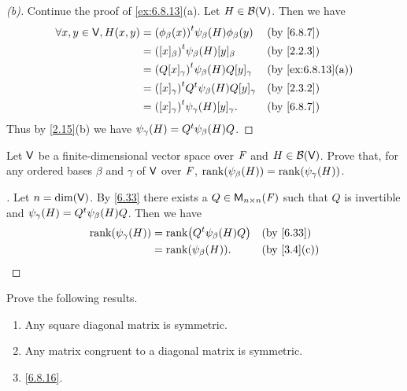\begin{proof}[(b)]
  Continue the proof of \cref{ex:6.8.13}(a).
  Let \(H \in \mathcal{B}(\mathsf{V})\).
  Then we have
  \begin{align*}
    \forall x, y \in \V, H(x, y) & = \tp{(\phi_{\beta}(x))} \psi_{\beta}(H) \phi_{\beta}(y)    &  & \by{6.8.7}        \\
                                 & = \tp{([x]_{\beta})} \psi_{\beta}(H) [y]_{\beta}            &  & \by{2.2.3}        \\
                                 & = \tp{(Q [x]_{\gamma})} \psi_{\beta}(H) Q [y]_{\gamma}      &  & \by{ex:6.8.13}[a] \\
                                 & = \tp{([x]_{\gamma})} \tp{Q} \psi_{\beta}(H) Q [y]_{\gamma} &  & \by{2.3.2}        \\
                                 & = \tp{([x]_{\gamma})} \psi_{\gamma}(H) [y]_{\gamma}.        &  & \by{6.8.7}
  \end{align*}
  Thus by \cref{2.15}(b) we have \(\psi_{\gamma}(H) = {Q}^{t} \psi_{\beta}(H) Q\).
\end{proof}

\begin{ex}\label{ex:6.8.14}
  Let \(\mathsf{V}\) be a finite-dimensional vector space over \(\mathit{F}\) and \(H \in \mathcal{B}(\mathsf{V})\).
  Prove that, for any ordered bases \(\beta\) and \(\gamma\) of \(\mathsf{V}\) over \(\mathit{F}\), \(\rk{\psi_{\beta}(H)} = \rk{\psi_{\gamma}(H)}\).
\end{ex}

\begin{proof}[]
  Let \(n = \dim(\mathsf{V})\).
  By \cref{6.33} there exists a \(Q \in \ms[n][n][\F]\) such that \(Q\) is invertible and \(\psi_{\gamma}(H) = {Q}^{t} \psi_{\beta}(H) Q\).
  Then we have
  \begin{align*}
    \rk{\psi_{\gamma}(H)} & = \rk{\tp{Q} \psi_{\beta}(H) Q} &  & \by{6.33}   \\
                          & = \rk{\psi_{\beta}(H)}.         &  & \by{3.4}[c]
  \end{align*}
\end{proof}

\begin{ex}\label{ex:6.8.15}
  Prove the following results.
  \begin{enumerate}
    \item Any square diagonal matrix is symmetric.
    \item Any matrix congruent to a diagonal matrix is symmetric.
    \item \cref{6.8.16}.
  \end{enumerate}
\end{ex}

